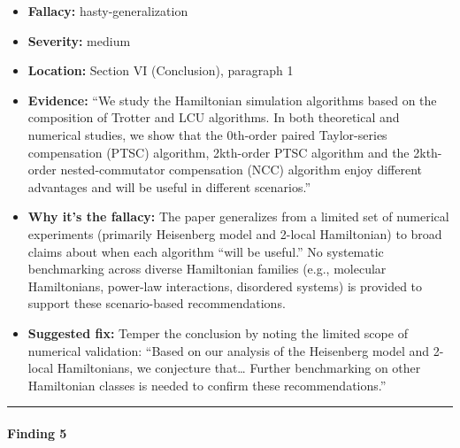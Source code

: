 \documentclass[10pt,letterpaper]{article}
\providecommand{\tightlist}{\setlength{\itemsep}{0pt}\setlength{\parskip}{0pt}}
\begin{document}
\begin{itemize}
\tightlist
\item
  \textbf{Fallacy:} hasty-generalization
\item
  \textbf{Severity:} medium
\item
  \textbf{Location:} Section VI (Conclusion), paragraph 1
\item
  \textbf{Evidence:} ``We study the Hamiltonian simulation algorithms based on the composition of Trotter and LCU algorithms. In both theoretical and numerical studies, we show that the 0th-order paired Taylor-series compensation (PTSC) algorithm, 2kth-order PTSC algorithm and the 2kth-order nested-commutator compensation (NCC) algorithm enjoy different advantages and will be useful in different scenarios.''
\item
  \textbf{Why it's the fallacy:} The paper generalizes from a limited set of numerical experiments (primarily Heisenberg model and 2-local Hamiltonian) to broad claims about when each algorithm ``will be useful.'' No systematic benchmarking across diverse Hamiltonian families (e.g., molecular Hamiltonians, power-law interactions, disordered systems) is provided to support these scenario-based recommendations.
\item
  \textbf{Suggested fix:} Temper the conclusion by noting the limited scope of numerical validation: ``Based on our analysis of the Heisenberg model and 2-local Hamiltonians, we conjecture that\ldots{} Further benchmarking on other Hamiltonian classes is needed to confirm these recommendations.''
\end{itemize}

\begin{center}\rule{0.5\linewidth}{0.5pt}\end{center}

\hypertarget{finding-5}{%
\paragraph{Finding 5}\label{finding-5}}
\end{document}
